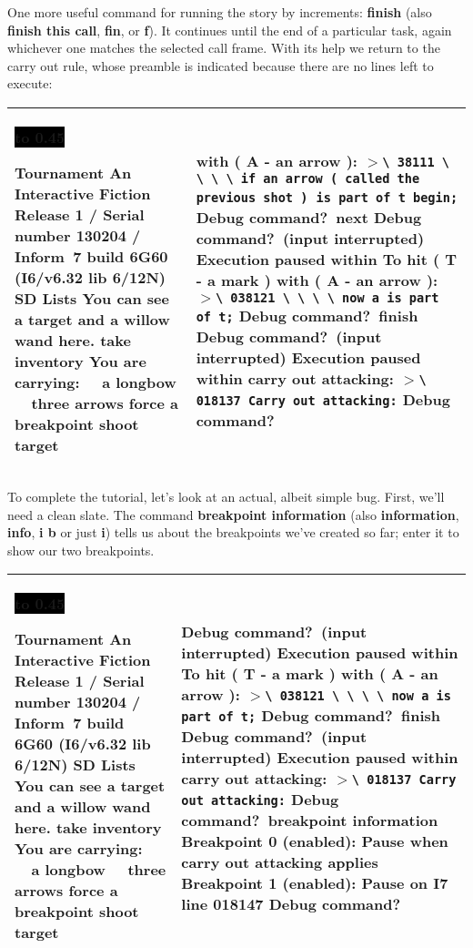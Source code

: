 \documentclass{book}
\newcommand{\n}{\hspace*{\fill}\newline}
\newcommand{\terp}[2]{\begin{center}\begin{tabular}{p{0.45\textwidth}|p{0.45\textwidth}}\midrule #1&#2\\\midrule\end{tabular}\end{center}}
\newcommand{\glkheading}[1]{\textbf{#1}}
\newcommand{\glkinput}[1]{\textbf{#1}}
\newcommand{\glkstatusline}[2]{\centerline{\colorbox{black}{\hbox to 0.45\textwidth{\textcolor{white}{#1\hfil #2}}}}}
\newcommand{\storyprompt}{\raisebox{1.5pt}{\(>\)}}
\newcommand{\cursor}{\raisebox{-1.5pt}{\RectangleThin}}
\newcommand{\markedindent}{\(>\)}
\begin{document}
One more useful command for running the story by increments: \glkinput{finish}
(also \glkinput{finish this call}, \glkinput{fin}, or \glkinput{f}).  It
continues until the end of a particular task, again whichever one matches the
selected call frame.  With its help we return to the carry out rule, whose
preamble is indicated because there are no lines left to execute:

\terp{\glkstatusline{Lists}{0/2}\n
  \glkheading{Tournament}\n
  An Interactive Fiction\n
  Release 1 / Serial number 130204 / Inform~7 build 6G60 (I6/v6.32 lib 6/12N) SD\n
  \n
  \glkheading{Lists}\n
  You can see a target and a willow wand here.\n
  \n
  \storyprompt\glkinput{take inventory}\n
  You are carrying:\n
  \null\ \ a longbow\n
  \null\ \ three arrows\n
  \n
  \storyprompt\glkinput{force a breakpoint}\n
  \storyprompt\glkinput{shoot target}}{%
  with ( A - an arrow ):\n
  \markedindent \lstinline{\ 38111 \ \ \ \ if an arrow ( called the previous shot )}\ \lstinline{is part of t begin;}\n
  \n
  Debug command?\ \glkinput{next}\n
  \n
  Debug command?\ (input interrupted)\n
  \n
  Execution paused within To hit ( T - a mark ) with ( A - an arrow ):\n
  \markedindent \lstinline{\ 038121 \ \ \ \ now a is part of t;}\n
  \n
  Debug command?\ \glkinput{finish}\n
  \n
  Debug command?\ (input interrupted)\n
  \n
  Execution paused within carry out attacking:\n
  \markedindent \lstinline{\ 018137 Carry out attacking:}\n
  \n
  Debug command?\ \cursor}

To complete the tutorial, let's look at an actual, albeit simple bug.  First,
we'll need a clean slate.  The command \glkinput{breakpoint information} (also
\glkinput{information}, \glkinput{info}, \glkinput{i b} or just \glkinput{i})
tells us about the breakpoints we've created so far; enter it to show our two
breakpoints.

\terp{\glkstatusline{Lists}{0/2}\n
  \glkheading{Tournament}\n
  An Interactive Fiction\n
  Release 1 / Serial number 130204 / Inform~7 build 6G60 (I6/v6.32 lib 6/12N) SD\n
  \n
  \glkheading{Lists}\n
  You can see a target and a willow wand here.\n
  \n
  \storyprompt\glkinput{take inventory}\n
  You are carrying:\n
  \null\ \ a longbow\n
  \null\ \ three arrows\n
  \n
  \storyprompt\glkinput{force a breakpoint}\n
  \storyprompt\glkinput{shoot target}}{%
  Debug command?\ (input interrupted)\n
  \n
  Execution paused within To hit ( T - a mark ) with ( A - an arrow ):\n
  \markedindent \lstinline{\ 038121 \ \ \ \ now a is part of t;}\n
  \n
  Debug command?\ \glkinput{finish}\n
  \n
  Debug command?\ (input interrupted)\n
  \n
  Execution paused within carry out attacking:\n
  \markedindent \lstinline{\ 018137 Carry out attacking:}\n
  \n
  Debug command?\ \glkinput{breakpoint information}\n
  \n
  Breakpoint 0 (enabled): Pause when carry out attacking applies\n
  Breakpoint 1 (enabled): Pause on I7 line 018147\n
  \n
  Debug command?\ \cursor}
\end{document}

